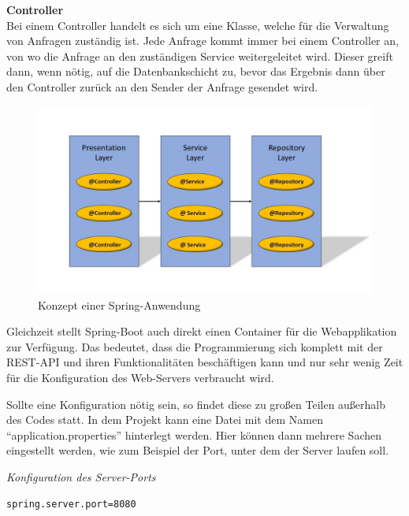 \textbf{Controller}\\
Bei einem Controller handelt es sich um eine Klasse, welche für die Verwaltung von Anfragen zuständig ist. Jede Anfrage kommt immer bei einem Controller an, von wo die Anfrage an den zuständigen Service weitergeleitet wird. Dieser greift dann, wenn nötig, auf die Datenbankschicht zu, bevor das Ergebnis dann über den Controller zurück an den Sender der Anfrage gesendet wird.\\

\begin{figure}[htp]     %
\centering
\includegraphics[width=1\textwidth]{bilder/SpringLayers} 
\caption[Der Grafik \url{http://image.slidesharecdn.com/springsourceusi2009v3-0-090702135517-phpapp01/95/developing-modular-java-applications-13-728.jpg?cb=1246543977} nachempfunden]{Konzept einer Spring-Anwendung}
\end{figure} 

Gleichzeit stellt Spring-Boot auch direkt einen Container für die Webapplikation zur Verfügung. Das bedeutet, dass die Programmierung sich komplett mit der REST-API und ihren Funktionalitäten beschäftigen kann und nur sehr wenig Zeit für die Konfiguration des Web-Servers verbraucht wird.

Sollte eine Konfiguration nötig sein, so findet diese zu großen Teilen außerhalb des Codes statt. In dem Projekt kann eine Datei mit dem Namen ``application.properties'' hinterlegt werden. Hier können dann mehrere Sachen eingestellt werden, wie zum Beispiel der Port, unter dem der Server laufen soll.\\

\begin{minipage}{\textwidth}
\emph{Konfiguration des Server-Ports}
\begin{lstlisting}
spring.server.port=8080
\end{lstlisting} 
\end{minipage}

